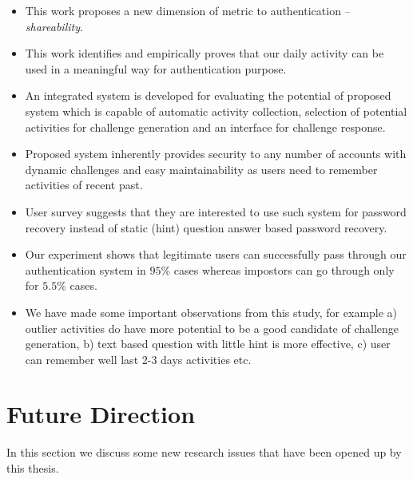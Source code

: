 \begin{itemize}
\item This work proposes a new dimension of metric to authentication -- {\em shareability}.\\
\item This work identifies and empirically proves that our daily activity can be used in a meaningful way for authentication purpose.\\
\item An integrated system is developed for evaluating the potential of proposed system which is capable of automatic activity collection, selection of potential activities for challenge generation and an interface for challenge response.\\
\item Proposed system inherently provides security to any number of accounts with dynamic challenges and easy maintainability as users need to remember activities of recent past.\\ 
\item User survey suggests that they are interested to use such system for password recovery instead of static (hint) question answer based password recovery.\\
\item Our experiment shows that legitimate users can successfully pass through our authentication system in $95\%$ cases whereas impostors can go through only for $5.5\%$ cases.\\
\item We have made some important observations from this study, for example a) outlier activities do have more potential to be a good candidate of challenge generation, b) text based question with little hint is more effective, c) user can remember well last 2-3 days activities etc.
\end{itemize}

\section{Future Direction} In this section we discuss some new research issues that have been opened up by this thesis.
